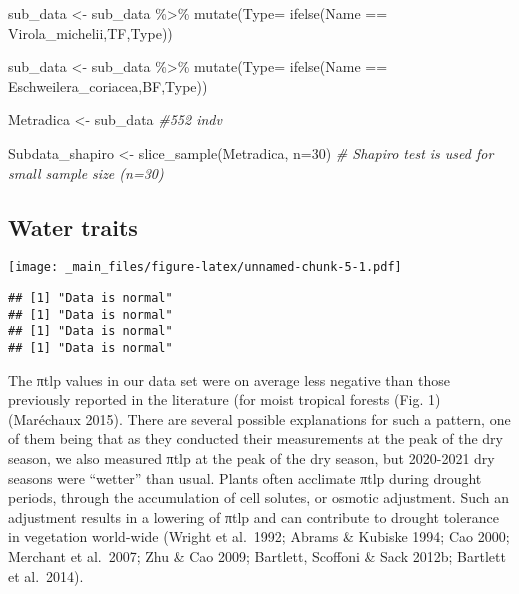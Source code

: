 \documentclass[
]{book}
\newenvironment{Shaded}{\begin{snugshade}}{\end{snugshade}}
\newcommand{\AttributeTok}[1]{\textcolor[rgb]{0.77,0.63,0.00}{#1}}
\newcommand{\CommentTok}[1]{\textcolor[rgb]{0.56,0.35,0.01}{\textit{#1}}}
\newcommand{\DecValTok}[1]{\textcolor[rgb]{0.00,0.00,0.81}{#1}}
\newcommand{\FunctionTok}[1]{\textcolor[rgb]{0.00,0.00,0.00}{#1}}
\newcommand{\NormalTok}[1]{#1}
\newcommand{\OtherTok}[1]{\textcolor[rgb]{0.56,0.35,0.01}{#1}}
\newcommand{\SpecialCharTok}[1]{\textcolor[rgb]{0.00,0.00,0.00}{#1}}
\newcommand{\StringTok}[1]{\textcolor[rgb]{0.31,0.60,0.02}{#1}}
\begin{document}
\begin{Shaded}
\begin{Highlighting}[]
\NormalTok{sub\_data }\OtherTok{\textless{}{-}}\NormalTok{ sub\_data }\SpecialCharTok{\%\textgreater{}\%} \FunctionTok{mutate}\NormalTok{(}\AttributeTok{Type=} \FunctionTok{ifelse}\NormalTok{(Name }\SpecialCharTok{==} \StringTok{\textquotesingle{}Virola\_michelii\textquotesingle{}}\NormalTok{,}\StringTok{\textquotesingle{}TF\textquotesingle{}}\NormalTok{,Type))}

\NormalTok{sub\_data }\OtherTok{\textless{}{-}}\NormalTok{ sub\_data }\SpecialCharTok{\%\textgreater{}\%} \FunctionTok{mutate}\NormalTok{(}\AttributeTok{Type=} \FunctionTok{ifelse}\NormalTok{(Name }\SpecialCharTok{==} \StringTok{\textquotesingle{}Eschweilera\_coriacea\textquotesingle{}}\NormalTok{,}\StringTok{\textquotesingle{}BF\textquotesingle{}}\NormalTok{,Type))}

\NormalTok{Metradica }\OtherTok{\textless{}{-}}\NormalTok{ sub\_data }\CommentTok{\#552 indv}


\NormalTok{Subdata\_shapiro }\OtherTok{\textless{}{-}} \FunctionTok{slice\_sample}\NormalTok{(Metradica, }\AttributeTok{n=}\DecValTok{30}\NormalTok{) }\CommentTok{\# Shapiro test is used for small sample size (n=30)}
\end{Highlighting}
\end{Shaded}

\hypertarget{water-traits}{%
\subsection{Water traits}\label{water-traits}}

\texttt{[image: \_main\_files/figure-latex/unnamed-chunk-5-1.pdf]}

\begin{verbatim}
## [1] "Data is normal"
## [1] "Data is normal"
## [1] "Data is normal"
## [1] "Data is normal"
\end{verbatim}

The πtlp values in our data set were on average less negative than those previously reported in the literature (for moist tropical forests (Fig. 1) (Maréchaux 2015). There are several possible explanations for such a pattern, one of them being that as they conducted their measurements at the peak of the dry season, we also measured πtlp at the peak of the dry season, but 2020-2021 dry seasons were ``wetter'' than usual. Plants often acclimate πtlp during drought periods, through the accumulation of cell solutes, or osmotic adjustment. Such an adjustment results in a lowering of πtlp and can contribute to drought tolerance in vegetation world-wide (Wright et al.~1992; Abrams \& Kubiske 1994; Cao 2000; Merchant et al.~2007; Zhu \& Cao 2009; Bartlett, Scoffoni \& Sack 2012b; Bartlett et al.~2014).
\end{document}

